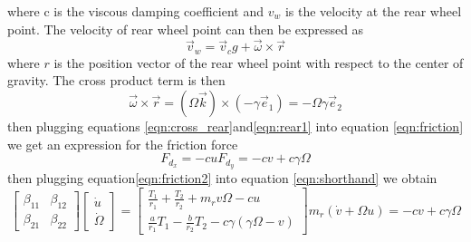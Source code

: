 \documentclass{article}
\begin{document}
	 where c is the viscous damping coefficient and $v_w$ is the velocity at the rear wheel point. The velocity of rear wheel point can then be expressed as 
	 \begin{equation}
	 \vec{v}_w = \vec{v}_cg + \vec{\omega}\times\vec{r}
	 \label{eqn:rear1}
	 \end{equation}
	 where $r$ is the position vector of the rear wheel point with respect to the center of gravity. The cross product term is then
	 \begin{equation}
	 \vec{\omega}\times\vec{r} = \left(\Omega\vec{k}\right)\times\left(-\gamma\vec{e}_1\right) =- \Omega\gamma \vec{e}_2
	 \label{eqn:cross_rear}
	 \end{equation}
	 then plugging equations \ref{eqn:cross_rear}and\ref{eqn:rear1} into equation \ref{eqn:friction} we get an expression for the friction force
	 \begin{subequations}
	 	\begin{equation}
	 	F_{d_{x}} = -cu
		\end{equation}
		\begin{equation}
		F_{d_{y}} = -cv+c\gamma\Omega
		\end{equation}
		\label{eqn:friction2}
	 \end{subequations}
	 then plugging equation\ref{eqn:friction2} into equation \ref{eqn:shorthand} we obtain
	 \begin{subequations}
	 	\begin{equation}
	 	\begin{bmatrix}
	 	\beta_{11} & \beta_{12}\\\beta_{21}&\beta_{22}
	 	\end{bmatrix}\begin{bmatrix}
	 	\dot{u}\\\dot{\Omega}
	 	\end{bmatrix} = \begin{bmatrix}
	 	\frac{T_1}{r_1}+\frac{T_2}{r_2}+m_rv\Omega-cu \\\frac{a}{r_1}T_1-\frac{b}{r_2}T_2-c\gamma\left(\gamma\Omega-v\right)
	 	\end{bmatrix}
	 	\end{equation}
	 	\begin{equation}
	 	m_r\left(\dot{v}+\Omega u\right) = -cv+c\gamma\Omega
	 	\end{equation}
	 	\label{eqn:shorthand2}
	 \end{subequations}
	 
\end{document}
